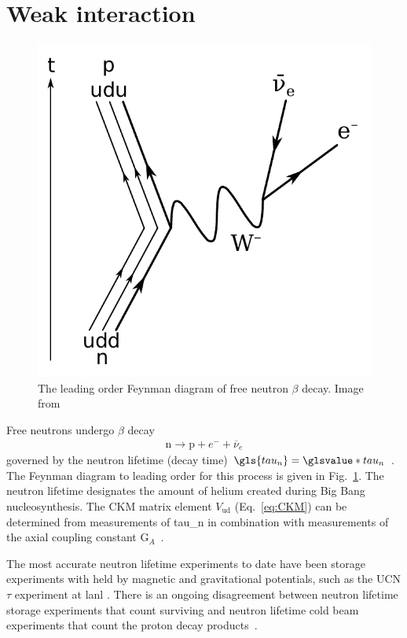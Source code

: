 \section{Weak interaction}\label{sec:weak_interaction}


\begin{figure}[htp]
    \centering
    \includegraphics[width=0.3 \textwidth]{figures/beta_negative_decay.pdf}
    \caption[The leading order Feynman diagram of free neutron $\beta$ decay]
    {The leading order  Feynman diagram of free neutron $\beta$ decay. Image from \cite{beta_decay_fig}}
    \label{fig:beta_decay}
\end{figure}

Free neutrons undergo $\beta$ decay
%
\begin{gather}
    \text{n}\rightarrow \text{p}+ e^-+\overline{\nu}_e
\end{gather}
%
governed by the neutron lifetime (decay time) $\gls{tau_n}=\glsvalue*{tau_n}$ \cite{pdg2022}. The Feynman diagram to leading order for this process is given in Fig.~\ref{fig:beta_decay}. The neutron lifetime designates the amount of helium created during Big Bang nucleosynthesis. The CKM matrix element $V_\text{ud}$ (Eq.~\ref{eq:CKM}) can be determined from measurements of \gls{tau_n} in combination with measurements of the axial coupling constant G$_A$~\cite{Young2014}.

The most accurate neutron lifetime experiments to date have been storage experiments with \ucn held by magnetic and gravitational potentials, such as the UCN$\tau$ experiment at \acrshort{lanl} \cite{gonzalez_ucn_tau}. There is an ongoing disagreement between neutron lifetime storage experiments that count surviving \ucn and neutron lifetime cold beam experiments that count the proton decay products~\cite{czarnecki2018}.

